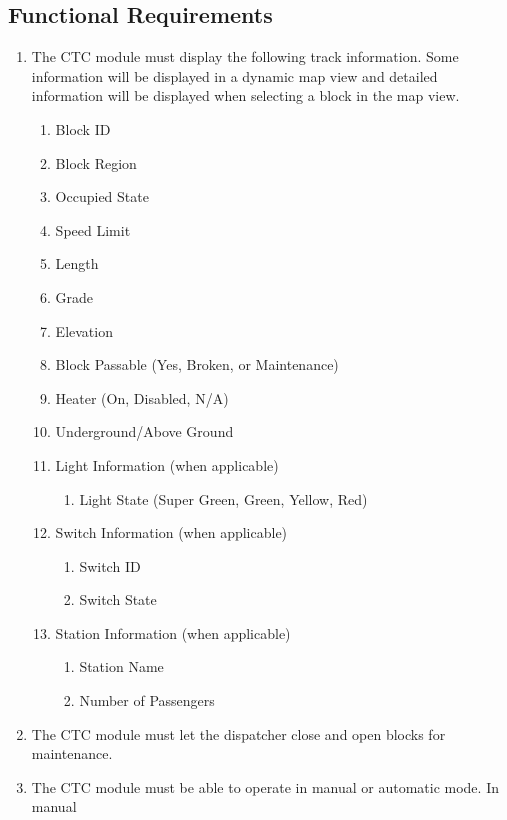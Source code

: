\documentclass{scrreprt}
\begin{document}
\subsection{Functional Requirements}
\begin{enumerate}
    \item The CTC module must display the following track information. Some information
    will be displayed in a dynamic map view and detailed information will be displayed
    when selecting a block in the map view.
    \begin{enumerate}
        \item Block ID
        \item Block Region
        \item Occupied State
        \item Speed Limit
        \item Length
        \item Grade
        \item Elevation
        \item Block Passable (Yes, Broken, or Maintenance)
        \item Heater (On, Disabled, N/A)
        \item Underground/Above Ground
        \item Light Information (when applicable)
        \begin{enumerate}
            \item Light State (Super Green, Green, Yellow, Red)
        \end{enumerate}
        \item Switch Information (when applicable)
        \begin{enumerate}
            \item Switch ID
            \item Switch State
        \end{enumerate}
        \item Station Information (when applicable)
        \begin{enumerate}
            \item Station Name
            \item Number of Passengers
        \end{enumerate}
    \end{enumerate}
    \item The CTC module must let the dispatcher close and open blocks for maintenance.
    \item The CTC module must be able to operate in manual or automatic mode. In manual

\end{enumerate}
\end{document}
